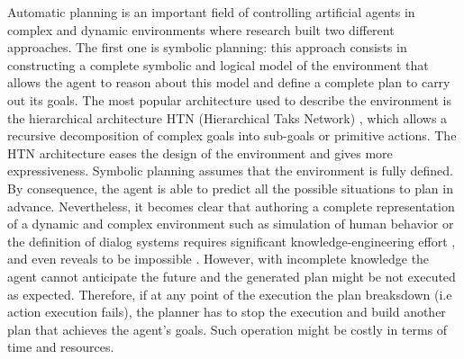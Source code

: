 \documentclass[conference]{IEEEtran}
\begin{document}
\par Automatic planning is an important field of controlling artificial agents in complex and dynamic environments where research built two different approaches. The first one is symbolic planning: this approach consists in constructing a complete symbolic and logical model of the environment that allows the agent to reason about this model and define a complete plan to carry out its goals.  
The most popular architecture used to describe the environment is the hierarchical architecture HTN (Hierarchical Taks Network) \cite{erol1996hierarchical}, which allows a recursive decomposition of complex goals into sub-goals or primitive actions. The HTN architecture eases the design of the environment and gives more expressiveness. Symbolic planning assumes that the environment is fully defined. By consequence,  the agent is able to predict all the possible situations to plan in advance. Nevertheless, it becomes clear that authoring a complete representation of a dynamic and complex environment such as simulation of human behavior \cite{conte1998mas} or the definition of dialog systems \cite{allen2002human} requires significant  knowledge-engineering effort \cite{zhuo2009learning}, and even reveals to be impossible \cite{maes1990designing}. However, with incomplete knowledge the agent cannot anticipate the future and the generated plan might be not executed as expected. Therefore, if at any point of the execution the plan breaksdown (i.e action execution fails), the planner has to stop the execution and build another plan that achieves the agent's goals. Such operation might be costly in terms of time and resources. 
\end{document}
